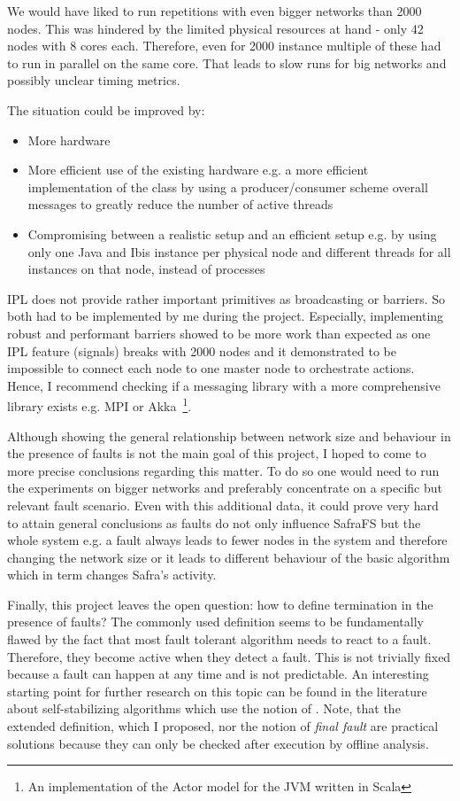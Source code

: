 We would have liked to run repetitions with even bigger networks than 2000 nodes.
This was hindered by the limited physical resources at hand - only 42 nodes with 8 cores each.
Therefore, even for 2000 instance multiple of these had to run in parallel on the same core.
That leads to slow runs for big networks and possibly unclear timing metrics.

The situation could be improved by:
\begin{itemize}
    \item More hardware
    \item More efficient use of the existing hardware e.g. a more efficient implementation of the  class by using a producer/consumer scheme overall messages to greatly reduce the number of active threads
    \item Compromising between a realistic setup and an efficient setup e.g. by using only one Java and Ibis instance per physical node and different threads for all instances on that node, instead of processes
\end{itemize}


IPL does not provide rather important primitives as broadcasting or barriers.
So both had to be implemented by me during the project.
Especially, implementing robust and performant barriers showed to be more work than expected as one IPL feature (signals) breaks with 2000 nodes and it demonstrated to be impossible to connect each node to one master node to orchestrate actions.
Hence, I recommend checking if a messaging library with a more comprehensive library exists e.g. MPI or Akka~\footnote{An implementation of the Actor model for the JVM written in Scala}.

Although showing the general relationship between network size and behaviour in the presence of faults is not the main goal of this project, I hoped to come to more precise conclusions regarding this matter.
To do so one would need to run the experiments on bigger networks and preferably concentrate on a specific but relevant fault scenario.
Even with this additional data, it could prove very hard to attain general conclusions as faults do not only influence SafraFS but the whole system e.g. a fault always leads to fewer nodes in the system and therefore changing the network size or it leads to different behaviour of the basic algorithm which in term changes Safra's activity.

Finally, this project leaves the open question: how to define termination in the presence of faults?
The commonly used definition seems to be fundamentally flawed by the fact that most fault tolerant algorithm needs to react to a fault.
Therefore, they become active when they detect a fault.
This is not trivially fixed because a fault can happen at any time and is not predictable.
An interesting starting point for further research on this topic can be found in the literature about self-stabilizing algorithms which use the notion of .
Note, that the extended definition, which I proposed, nor the notion of \textit{final fault} are practical solutions because they can only be checked after execution by offline analysis.